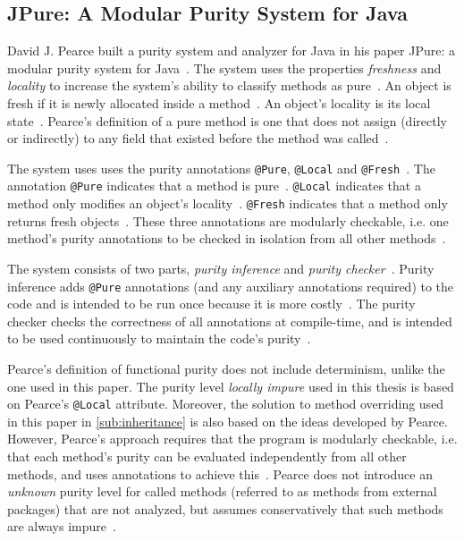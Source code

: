 \documentclass[a4paper,12pt]{article}
\begin{document}
\subsection{JPure: A Modular Purity System for Java} \label{sub:JPure: A Modular Purity System for Java}
David J. Pearce built a purity system and analyzer for Java in his paper JPure: a modular purity system for Java~\cite{pearce2011jpure}. The system uses the properties \textit{freshness} and \textit{locality} to increase the system's ability to classify methods as pure~\cite{pearce2011jpure}. An object is fresh if it is newly allocated inside a method~\cite{pearce2011jpure}. An object's locality is its local state~\cite{pearce2011jpure}. Pearce's definition of a pure method is one that does not assign (directly or indirectly) to any field that existed before the method was called~\cite{pearce2011jpure}.

The system uses uses the purity annotations \texttt{@Pure}, \texttt{@Local} and \texttt{@Fresh}~\cite{pearce2011jpure}. The annotation \texttt{@Pure} indicates that a method is pure~\cite{pearce2011jpure}. \texttt{@Local} indicates that a method only modifies an object's locality~\cite{pearce2011jpure}. \texttt{@Fresh} indicates that a method only returns fresh objects~\cite{pearce2011jpure}. These three annotations are modularly checkable, i.e. one method's purity annotations to be checked in isolation from all other methods~\cite{pearce2011jpure}.

The system consists of two parts, \textit{purity inference} and \textit{purity checker}~\cite{pearce2011jpure}. Purity inference adds \texttt{@Pure} annotations (and any auxiliary annotations required) to the code and is intended to be run once because it is more costly~\cite{pearce2011jpure}. The purity checker checks the correctness of all annotations at compile-time, and is intended to be used continuously to maintain the code's purity~\cite{pearce2011jpure}.

Pearce's definition of functional purity does not include determinism, unlike the one used in this paper. The purity level \textit{locally impure} used in this thesis is based on Pearce's \texttt{@Local} attribute. Moreover, the solution to method overriding used in this paper in \autoref{sub:inheritance} is also based on the ideas developed by Pearce. However, Pearce's approach requires that the program is modularly checkable, i.e. that each method's purity can be evaluated independently from all other methods, and uses annotations to achieve this~\cite{pearce2011jpure}.  Pearce does not introduce an \textit{unknown} purity level for called methods (referred to as methods from external packages) that are not analyzed, but assumes conservatively that such methods are always impure~\cite{pearce2011jpure}.
\end{document}
